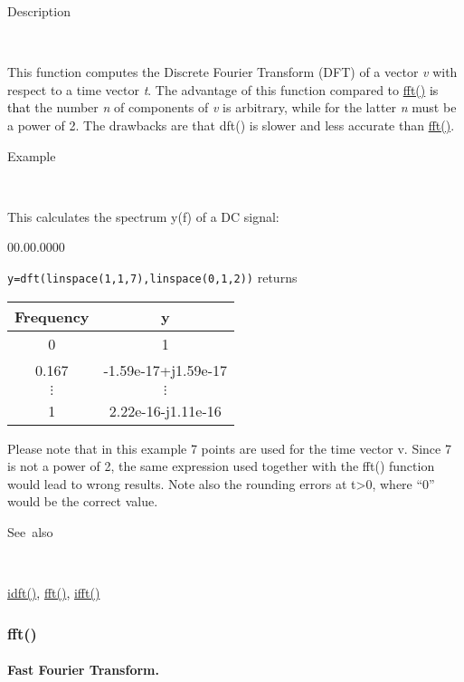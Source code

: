 \begin{description}
\item [Description]~
\end{description}
This function computes the Discrete Fourier Transform (DFT) of a vector
\textit{v} with respect to a time vector \textit{t}. The advantage
of this function compared to \textcolor{blue}{\hyperlink{fft}{fft()}}
\textcolor{black}{is that} the number \textit{n} of components of
\textit{v} is arbitrary, while for the latter \textit{n} must be a
power of 2. The drawbacks are that dft() is slower and less accurate
than \textcolor{blue}{\hyperlink{fft}{fft()}}.

\begin{description}
\item [Example]~
\end{description}
This calculates the spectrum y(f) of a DC signal:

\begin{lyxlist}{00.00.0000}
\item [\texttt{y=dft(linspace(1,1,7),linspace(0,1,2))}]returns \begin{tabular}{|c|c|}
\hline 
Frequency&
y\tabularnewline
\hline
\hline 
0&
1\tabularnewline
\hline 
0.167&
-1.59e-17+j1.59e-17\tabularnewline
\hline 
$\vdots$&
$\vdots$\tabularnewline
\hline 
1&
2.22e-16-j1.11e-16\tabularnewline
\hline
\end{tabular}
\end{lyxlist}
Please note that in this example 7 points are used for the time vector
v. Since 7 is not a power of 2, the same expression used together
with the fft() function would lead to wrong results. Note also the
rounding errors at t>0, where {}``0'' would be the correct value.

\begin{description}
\item [See~also]~
\end{description}
\textcolor{blue}{\hyperlink{idft}{idft()}}\textcolor{black}{,} \textcolor{blue}{\hyperlink{fft}{fft()}}\textcolor{black}{,}
\textcolor{blue}{\hyperlink{ifft}{ifft()}}


\newpage
\subsubsection*{\hypertarget{fft}{}{\Large fft()}}


\paragraph{\label{par:Fast-Fourier-Transform}Fast Fourier Transform.}

